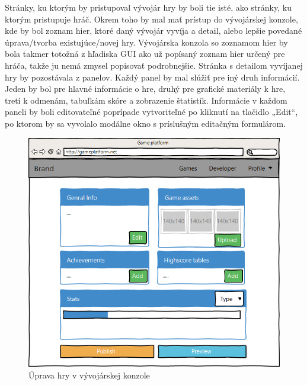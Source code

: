 Stránky, ku ktorým by pristupoval vývojár hry by boli tie isté, ako stránky, ku ktorým pristupuje hráč. Okrem toho by mal mať prístup do vývojárskej konzole, kde by bol zoznam hier, ktoré daný vývojár vyvíja a detail, alebo lepšie povedané úprava/tvorba existujúce/novej hry. Vývojárska konzola so zoznamom hier by bola takmer totožná z hľadiska GUI ako  už popísaný zoznam hier určený pre hráča, takže ju nemá zmysel popisovať podrobnejšie. Stránka s detailom vyvíjanej hry by pozostávala z panelov. Každý panel by mal slúžiť pre iný druh informácií. Jeden by bol pre hlavné informácie o hre, druhý pre grafické materiály k hre, tretí k odmenám, tabuľkám skóre a zobrazenie štatistík. Informácie v každom paneli by boli editovateľné poprípade vytvoriteľné po kliknutí na tlačidlo „Edit“, po ktorom by sa vyvolalo modálne okno s príslušným editačným formulárom.
\begin{figure}[h]
  \centering
  \includegraphics[scale=0.35]{fig/gui-detail-vyvojar.png}
  \caption{Úprava hry v vývojárskej konzole}
  \label{fig:guidetailvyvojar}
\end{figure}

